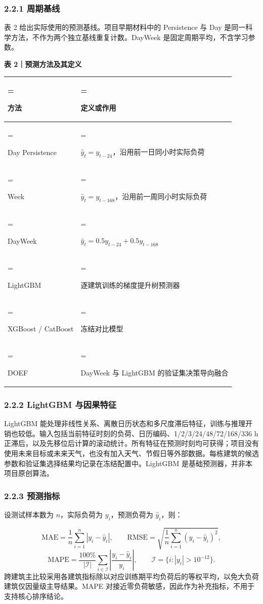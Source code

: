 \documentclass[12pt,a4paper]{article}
\begin{document}
\subsubsection{2.2.1 周期基线}
表 2 给出实际使用的预测基线。项目早期材料中的 Persistence 与 Day 是同一科学方法，不作为两个独立基线重复计数。DayWeek 是固定周期平均，不含学习参数。\par
\par\noindent\begin{minipage}{\linewidth}\textbf{表 2｜预测方法及其定义}\par\smallskip\renewcommand{\arraystretch}{1.2}\begin{tabularx}{\linewidth}{>{\hsize=0.65\hsize\linewidth=\hsize\raggedright\arraybackslash}X>{\hsize=1.35\hsize\linewidth=\hsize\raggedright\arraybackslash}X}\toprule
方法 & 定义或作用\\\midrule
Day Persistence & \(\hat{y}_t=y_{t-24}\)，沿用前一日同小时实际负荷\\
Week & \(\hat{y}_t=y_{t-168}\)，沿用前一周同小时实际负荷\\
DayWeek & \(\hat{y}_t=0.5y_{t-24}+0.5y_{t-168}\)\\
LightGBM & 逐建筑训练的梯度提升树预测器\\
XGBoost / CatBoost & 冻结对比模型\\
DOEF & DayWeek 与 LightGBM 的验证集决策导向融合\\
\bottomrule\end{tabularx}\end{minipage}\par
\subsubsection{2.2.2 LightGBM 与因果特征}
LightGBM 能处理非线性关系、离散日历状态和多尺度滞后特征，训练与推理开销也较低。输入包括当前特征时刻的负荷、日历编码、1/2/3/24/48/72/168/336 h 正滞后，以及先移位后计算的滚动统计。所有特征在预测时刻均可获得；项目没有使用未来目标或未来天气，也没有加入天气、节假日等外部数据。每栋建筑的候选参数和验证集选择结果均记录在冻结配置中。LightGBM 是基础预测器，并非本项目原创算法。\par
\subsubsection{2.2.3 预测指标}
设测试样本数为 \(n\)，实际负荷为 \(y_i\)，预测负荷为 \(\hat{y}_i\)，则：\par
\[
\mathrm{MAE}=\frac{1}{n}\sum_{i=1}^{n}|y_i-\hat{y}_i|,
\qquad
\mathrm{RMSE}=\sqrt{\frac{1}{n}\sum_{i=1}^{n}(y_i-\hat{y}_i)^2},
\]
\[
\mathrm{MAPE}=\frac{100\%}{|\mathcal I|}\sum_{i\in\mathcal I}\left|\frac{y_i-\hat{y}_i}{y_i}\right|,
\qquad \mathcal I=\{i:|y_i|>10^{-12}\}.
\]
跨建筑主比较采用各建筑指标除以对应训练期平均负荷后的等权平均，以免大负荷建筑仅因量级主导结果。MAPE 对接近零负荷敏感，因此作为补充指标，不用于支持核心排序结论。\par
\end{document}
